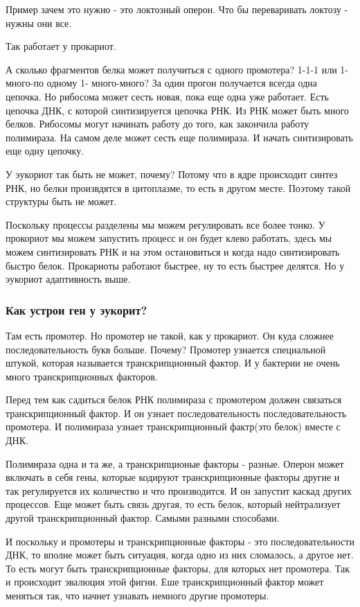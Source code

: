 Пример зачем это нужно - это локтозный оперон. Что бы переваривать локтозу - нужны они
все.  

Так работает у прокариот. 

А сколько фрагментов белка может получиться с одного промотера? 
1-1-1 или 1-много-по одному 1- много-много? За один прогон получается 
всегда одна цепочка. Но рибосома может сесть новая, пока еще одна уже работает. 
Есть цепочка ДНК, с которой синтизируется цепочка РНК. Из РНК может 
быть много белков. Рибосомы могут начинать работу до того, 
как закончила работу полимираза. На самом деле может 
сесть еще полимираза. И начать синтизировать еще одну цепочку. 

У эукориот так быть не может, почему? 
Потому что в ядре происходит синтез РНК, но белки произвдятся в цитоплазме, 
то есть в другом месте. Поэтому такой структуры быть не может. 

Поскольку процессы разделены мы можем регулировать все более тонко. 
У прокориот мы можем запустить процесс и он будет клево работать, 
здесь мы можем синтизировать РНК и на этом остановиться и 
когда надо синтизировать быстро белок. Прокариоты работают быстрее, 
ну то есть быстрее делятся. Но у эукориот адаптивность выше. 

\subsubsection{Как устрои ген у эукорит?} 
Там есть промотер. Но промотер не такой, как у прокариот. Он 
куда сложнее последовательность букв больше. Почему? Промотер 
узнается специальной штукой, которая называется 
транскрипционный фактор. И у бактерии не очень много транскрипционных 
факторов. 

Перед тем как садиться белок РНК полимираза с промотером
должен связаться транскрипционный фактор. И он узнает последовательность
последовательность промотера. И полимираза узнает
транскрипционный фактр(это белок) вместе с ДНК.

Полимираза одна и та же, а транскрипционые факторы - разные.
Оперон может включать в себя гены, которые кодируют транскрипционные факторы другие и 
так регулируется их количество и что производится. И он запустит каскад других процессов. 
Еще может быть связь другая, то есть белок, который нейтрализует другой транскрипционный фактор. 
Самыми разными способами. 

И поскольку и промотеры и транскрипционные факторы - это 
последовательности ДНК, то вполне может быть ситуация, когда одно из 
них сломалось, а другое нет. То есть могут быть транскрипционные факторы, 
для которых нет промотера. Так и происходит эвалюция этой фигни. 
Еше транскрипционный фактор может меняться так, что начнет узнавать 
немного другие промотеры. 

